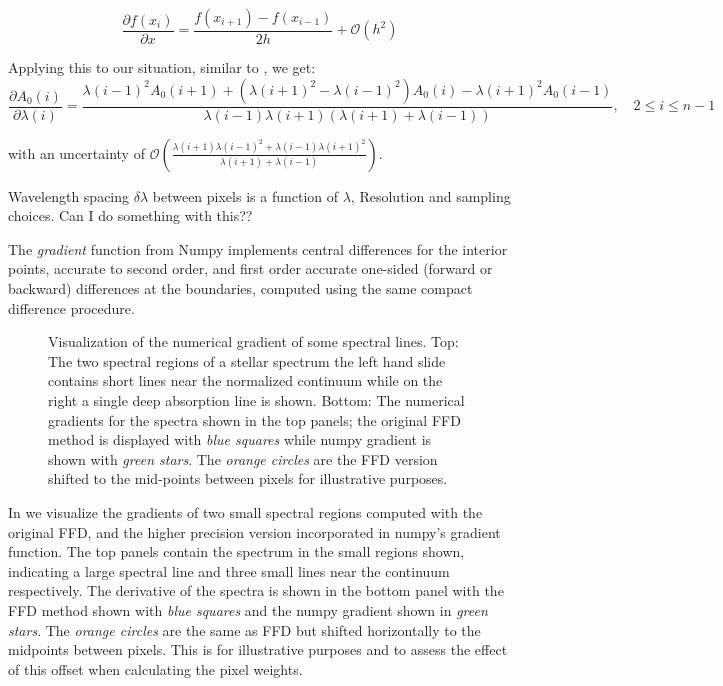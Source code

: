 \[\frac{\partial{f(x_i)}}{\partial{x}} = \frac{f\left(x_{i+1}\right) - f\left(x_{i-1}\right)}{2h} + \mathcal{O}\left(h^{2}\right)\]


Applying this to our situation, similar to , we get:
\[\frac{\partial A_0(i)}{\partial\lambda(i)} = \frac{{\lambda(i-1)}^{2} A_0(i+1) + ({\lambda(i+1)}^{2}-{\lambda(i-1)}^{2}) A_0(i) - {\lambda(i+1)}^{2} A_0(i-1)} {\lambda(i-1)\lambda(i+1)(\lambda(i+1) + \lambda(i-1))}, \hspace{1em} 2 \leq i \leq n-1\]

with an uncertainty of \(\mathcal{O}\left(\frac{\lambda(i+1){\lambda(i-1)}^{2} + \lambda(i-1){\lambda(i+1)}^{2}}{\lambda(i+1) + \lambda(i-1)}\right)\).


{\red{} Wavelength spacing \(\delta\lambda\) between pixels is a function of \(\lambda\), Resolution and sampling choices. Can I do something with this??}

The \emph{gradient} function from Numpy implements central differences for the interior points, accurate to second order, and first order accurate one-sided (forward or backward) differences at the boundaries, computed using the same compact difference procedure.

\begin{figure}
    \centering
    \caption{Visualization of the numerical gradient of some spectral lines. Top: The two spectral regions of a stellar spectrum the left hand slide contains short lines near the normalized continuum while on the right a single deep absorption line is shown. Bottom: The numerical gradients for the spectra shown in the top panels; the original FFD method is displayed  with \emph{blue squares} while numpy gradient is shown with \emph{green stars}. The \emph{orange circles} are the FFD version shifted to the mid-points between pixels for illustrative purposes.}
    \label{fig:gradients}
\end{figure}




In  we visualize the gradients of two small spectral regions computed with the original FFD, and the higher precision version incorporated in numpy's gradient function. The top panels contain the spectrum in the small regions shown, indicating a large spectral line and three small lines near the continuum respectively. The derivative of the spectra is shown in the bottom panel with the FFD method shown with \emph{blue squares} and the numpy gradient shown in \emph{green stars}. The \emph{orange circles} are the same as FFD but shifted horizontally to the midpoints between  pixels. This is for illustrative purposes and to assess the effect of this offset when calculating the pixel weights.

